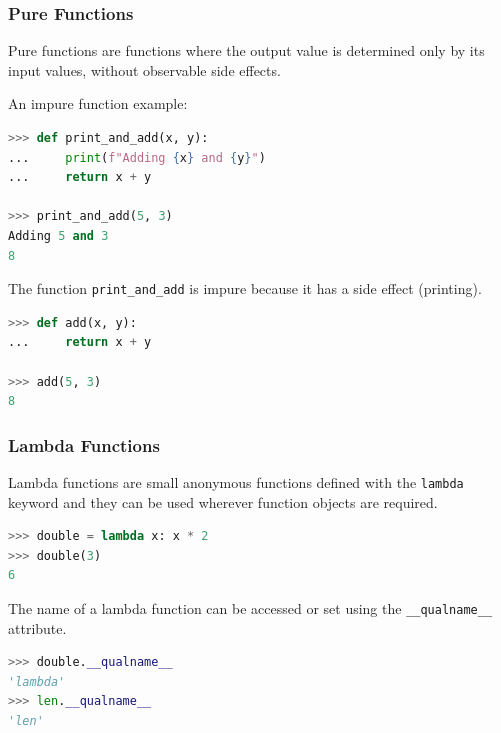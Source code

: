 \documentclass[envcountsect,10pt]{beamer}
\begin{document}
\begin{frame}[fragile]
    \frametitle{Pure Functions}

    Pure functions are functions where the output value is determined only by its input values, 
    without observable side effects.

    An impure function example:

    \begin{lstlisting}[language=Python]
>>> def print_and_add(x, y):
...     print(f"Adding {x} and {y}")
...     return x + y

>>> print_and_add(5, 3)
Adding 5 and 3
8
    \end{lstlisting}

    The function \texttt{print\_and\_add} is impure because it has a side effect (printing).

    \begin{lstlisting}[language=Python]
>>> def add(x, y):
...     return x + y

>>> add(5, 3)
8
    \end{lstlisting}

\end{frame}


\begin{frame}[fragile]
    \frametitle{Lambda Functions}

    Lambda functions are small anonymous functions defined with the \texttt{lambda} 
    keyword and they can be used wherever function objects are required.

    \begin{lstlisting}[language=Python]
>>> double = lambda x: x * 2
>>> double(3)
6
    \end{lstlisting}

    The name of a lambda function can be accessed or set using the \texttt{\_\_qualname\_\_} attribute.

    \begin{lstlisting}[language=Python]
>>> double.__qualname__
'lambda'
>>> len.__qualname__
'len'
    \end{lstlisting}

\end{frame}
\end{document}
